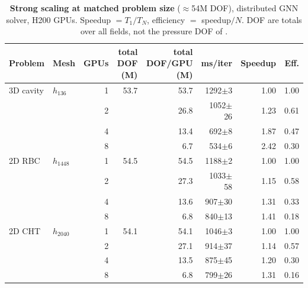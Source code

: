 \begin{table}[ht]
\centering
\caption{\textbf{Strong scaling at matched problem size} ($\approx$54M DOF), distributed GNN solver, H200 GPUs. Speedup $=T_1/T_N$, efficiency $=$ speedup$/N$. DOF are totals over all fields, not the pressure DOF of .}
\label{tab:strong}
\small\setlength{\tabcolsep}{4pt}
\begin{tabular}{llrrrrrr}
\toprule
Problem & Mesh & GPUs & total DOF (M) & total DOF/GPU (M) & ms/iter & Speedup & Eff. \\
\midrule
3D cavity & $h_{136}$ & 1 & 53.7 & 53.7 & 1292$\pm$3 & 1.00 & 1.00 \\
 &  & 2 &  & 26.8 & 1052$\pm$26 & 1.23 & 0.61 \\
 &  & 4 &  & 13.4 & 692$\pm$8 & 1.87 & 0.47 \\
 &  & 8 &  & 6.7 & 534$\pm$6 & 2.42 & 0.30 \\
\midrule
2D RBC & $h_{1448}$ & 1 & 54.5 & 54.5 & 1188$\pm$2 & 1.00 & 1.00 \\
 &  & 2 &  & 27.3 & 1033$\pm$58 & 1.15 & 0.58 \\
 &  & 4 &  & 13.6 & 907$\pm$30 & 1.31 & 0.33 \\
 &  & 8 &  & 6.8 & 840$\pm$13 & 1.41 & 0.18 \\
\midrule
2D CHT & $h_{2040}$ & 1 & 54.1 & 54.1 & 1046$\pm$3 & 1.00 & 1.00 \\
 &  & 2 &  & 27.1 & 914$\pm$37 & 1.14 & 0.57 \\
 &  & 4 &  & 13.5 & 875$\pm$45 & 1.20 & 0.30 \\
 &  & 8 &  & 6.8 & 799$\pm$26 & 1.31 & 0.16 \\
\bottomrule
\end{tabular}
\end{table}
